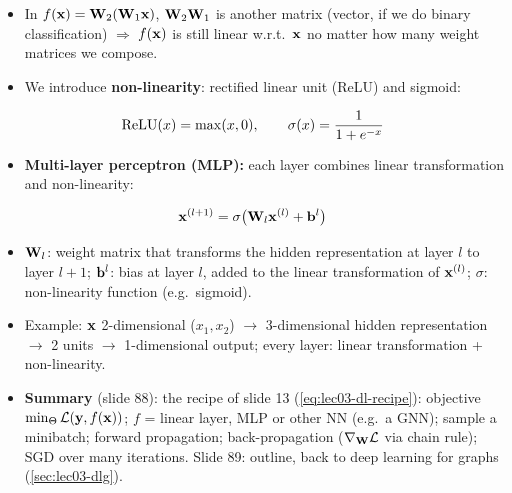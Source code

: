 \begin{itemize}
  \item In $f(\mathbf{x})=\mathbf{W}_2(\mathbf{W}_1\mathbf{x})$, $\mathbf{W}_2\mathbf{W}_1$ is another matrix (vector, if
    we do binary classification) $\Rightarrow$ $f(\mathbf{x})$ is still linear w.r.t.\
    $\mathbf{x}$ no matter how many weight matrices we compose.
  \item We introduce \textbf{non-linearity}: rectified linear unit (ReLU) and
    sigmoid:
\end{itemize}
\begin{equation}\label{eq:lec03-nonlin}
  \operatorname{ReLU}(x)=\max(x,0),\qquad \sigma(x)=\frac{1}{1+e^{-x}}
\end{equation}
\begin{itemize}
  \item \textbf{Multi-layer perceptron (MLP):} each layer combines linear
    transformation and non-linearity:
\end{itemize}
\begin{equation}\label{eq:lec03-mlp}
  \mathbf{x}^{(l+1)} = \sigma\bigl(\mathbf{W}_l\mathbf{x}^{(l)} + \mathbf{b}^{l}\bigr)
\end{equation}
\begin{itemize}
  \item $\mathbf{W}_l$: weight matrix that transforms the hidden representation at
    layer $l$ to layer $l+1$; $\mathbf{b}^l$: bias at layer $l$, added to the linear
    transformation of $\mathbf{x}^{(l)}$; $\sigma$: non-linearity function (e.g.\
    sigmoid).
  \item Example: $\mathbf{x}$ 2-dimensional ($x_1,x_2$) $\to$ 3-dimensional hidden
    representation $\to$ 2 units $\to$ 1-dimensional output; every layer:
    linear transformation + non-linearity.
  \item \textbf{Summary} (slide 88): the recipe of slide 13
    (\cref{eq:lec03-dl-recipe}): objective $\min_\Theta\mathcal{L}(\mathbf{y},f(\mathbf{x}))$; $f$ =
    linear layer, MLP or other NN (e.g.\ a GNN); sample a minibatch; forward
    propagation; back-propagation ($\nabla_{\mathbf{W}}\mathcal{L}$ via chain rule); SGD over
    many iterations. Slide 89: outline, back to deep learning for graphs
    (\cref{sec:lec03-dlg}).
\end{itemize}

